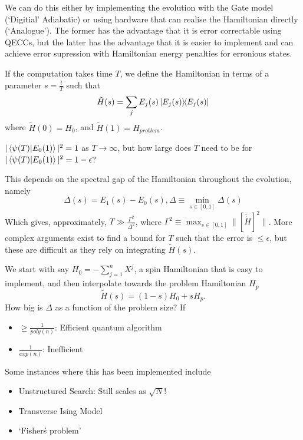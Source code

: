 \documentclass[11pt]{article}
\begin{document}
We can do this either by implementing the evolution with the Gate model (`Digitial' Adiabatic) or using hardware that can realise the Hamiltonian directly (`Analogue'). The former has the advantage that it is error correctable using QECCs, but the latter has the advantage that it is easier to implement and can achieve error supression with Hamiltonian energy penalties for erronious states.

If the computation takes time $T$, we define the Hamiltonian in terms of a parameter $s=\frac{t}{T}$ such that
\begin{equation}
    \tilde{H}(s)=\sum_{j}E_{j}(s)\ketbra{E_{j}(s)}{E_{j}(s)}
\end{equation}
where $\tilde{H}(0)=H_{0}$, and $\tilde{H}(1)=H_{problem}$.

$|\braket{\psi(T)}{E_{0}(1)}|^{2}=1$ as $T\rightarrow\infty$, but how large does $T$ need to be for $|\braket{\psi(T)}{E_{0}(1)}|^{2}=1-\epsilon$?

This depends on the spectral gap of the Hamiltonian throughout the evolution, namely
\begin{equation}
    \Delta(s)=E_{1}(s)-E_{0}(s), \Delta \equiv \min_{s\in[0,1]}\Delta(s)
\end{equation}
Which gives, approximately, $T\gg \frac{\Gamma^{2}}{\Delta^{2}}$, where $\Gamma^{2}\equiv \max_{s\in[0,1]}\|[\tilde{\dot{H}}]^{2}\|$.
More complex arguments exist to find a bound for $T$ such  that the error is $\leq \epsilon$, but these are difficult as they rely on integrating $\tilde{H}(s)$.

We start with say $H_{0}=-\sum_{j=1}^{n}X^{j}$, a spin Hamiltonian that is easy to implement, and then interpolate towards the problem Hamiltonian $H_{p}$
\begin{equation}
    \tilde{H}(s)=(1-s)H_{0} + sH_{p}.
\end{equation}
How big is $\Delta$ as a function of the problem size?
If
\begin{itemize}
    \item $\geq\frac{1}{poly(n)}$: Efficient quantum algorithm
    \item $\frac{1}{exp(n)}$: Inefficient
\end{itemize}

Some instances where this has been implemented include
\begin{itemize}
    \item Unstructured Search: Still scales as $\sqrt{N}$!
    \item Transverse Ising Model
    \item `Fisher\'s problem'
\end{itemize}
\end{document}
